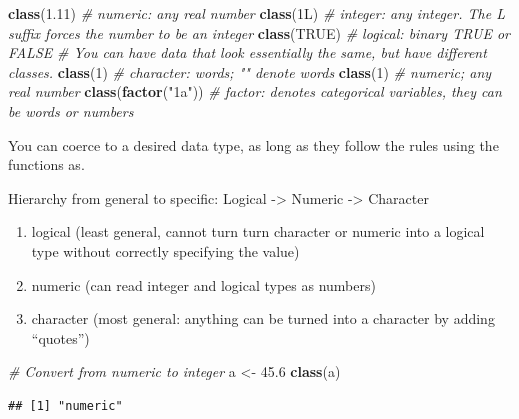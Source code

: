 \documentclass[
]{book}
\newenvironment{Shaded}{\begin{snugshade}}{\end{snugshade}}
\newcommand{\CommentTok}[1]{\textcolor[rgb]{0.56,0.35,0.01}{\textit{#1}}}
\newcommand{\ConstantTok}[1]{\textcolor[rgb]{0.56,0.35,0.01}{#1}}
\newcommand{\DataTypeTok}[1]{\textcolor[rgb]{0.13,0.29,0.53}{#1}}
\newcommand{\DecValTok}[1]{\textcolor[rgb]{0.00,0.00,0.81}{#1}}
\newcommand{\FloatTok}[1]{\textcolor[rgb]{0.00,0.00,0.81}{#1}}
\newcommand{\FunctionTok}[1]{\textcolor[rgb]{0.13,0.29,0.53}{\textbf{#1}}}
\newcommand{\NormalTok}[1]{#1}
\newcommand{\OtherTok}[1]{\textcolor[rgb]{0.56,0.35,0.01}{#1}}
\newcommand{\StringTok}[1]{\textcolor[rgb]{0.31,0.60,0.02}{#1}}
\providecommand{\tightlist}{%
  \setlength{\itemsep}{0pt}\setlength{\parskip}{0pt}}
\begin{document}
\begin{Shaded}
\begin{Highlighting}[]
\FunctionTok{class}\NormalTok{(}\FloatTok{1.11}\NormalTok{) }\CommentTok{\# numeric: any real number}
\FunctionTok{class}\NormalTok{(}\DecValTok{1}\DataTypeTok{L}\NormalTok{) }\CommentTok{\# integer: any integer. The L suffix forces the number to be an integer}
\FunctionTok{class}\NormalTok{(}\ConstantTok{TRUE}\NormalTok{) }\CommentTok{\# logical: binary TRUE or FALSE }
\CommentTok{\# You can have data that look essentially the same, but have different classes. }
\FunctionTok{class}\NormalTok{(}\StringTok{\textquotesingle{}1\textquotesingle{}}\NormalTok{) }\CommentTok{\# character: words; "" denote words}
\FunctionTok{class}\NormalTok{(}\DecValTok{1}\NormalTok{) }\CommentTok{\# numeric; any real number}
\FunctionTok{class}\NormalTok{(}\FunctionTok{factor}\NormalTok{(}\StringTok{"1a"}\NormalTok{)) }\CommentTok{\# factor: denotes categorical variables, they can be words or numbers}
\end{Highlighting}
\end{Shaded}

You can coerce to a desired data type, as long as they follow the rules
using the functions as.

Hierarchy from general to specific: Logical -\textgreater{} Numeric -\textgreater{} Character

\begin{enumerate}
\def\labelenumi{\arabic{enumi}.}
\tightlist
\item
  logical (least general, cannot turn turn character or numeric into a logical type without correctly specifying the value)
\item
  numeric (can read integer and logical types as numbers)
\item
  character (most general: anything can be turned into a character by adding ``quotes'')
\end{enumerate}

\begin{Shaded}
\begin{Highlighting}[]
\CommentTok{\# Convert from numeric to integer}
\NormalTok{a }\OtherTok{\textless{}{-}} \FloatTok{45.6}
\FunctionTok{class}\NormalTok{(a)}
\end{Highlighting}
\end{Shaded}

\begin{verbatim}
## [1] "numeric"
\end{verbatim}
\end{document}
